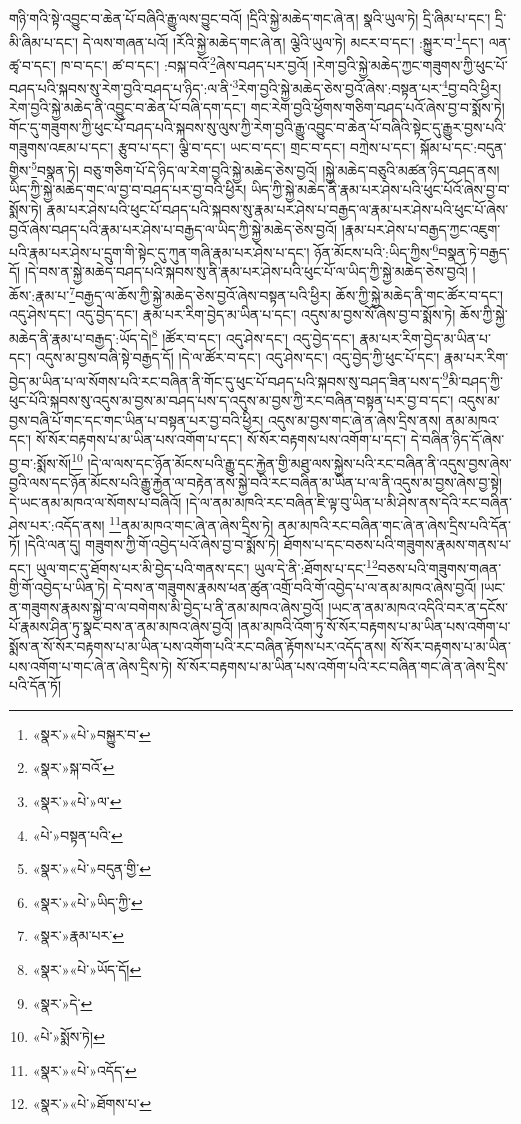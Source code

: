 གཉི་གའི་སྟེ་འབྱུང་བ་ཆེན་པོ་བཞིའི་རྒྱུ་ལས་བྱུང་བའོ། །དྲིའི་སྐྱེ་མཆེད་གང་ཞེ་ན། སྣའི་ཡུལ་ཏེ། དྲི་ཞིམ་པ་དང་། དྲི་མི་ཞིམ་པ་དང་། དེ་ལས་གཞན་པའོ། །རོའི་སྐྱེ་མཆེད་གང་ཞེ་ན། ལྕེའི་ཡུལ་ཏེ། མངར་བ་དང་། :སྐྱུར་བ་\footnote{«སྣར་»«པེ་»བསྐྱུར་བ་}དང་། ལན་ཚྭ་བ་དང་། ཁ་བ་དང་། ཚ་བ་དང་། :བསྐ་བའོ་\footnote{«སྣར་»སྐ་བའོ་}ཞེས་བཤད་པར་བྱའོ། །རེག་བྱའི་སྐྱེ་མཆེད་ཀྱང་གཟུགས་ཀྱི་ཕུང་པོ་བཤད་པའི་སྐབས་སུ་རེག་བྱའི་བཤད་པ་ཉིད་:ལ་ནི་\footnote{«སྣར་»«པེ་»ལ་}རེག་བྱའི་སྐྱེ་མཆེད་ཅེས་བྱའོ་ཞེས་:བསྟན་པར་\footnote{«པེ་»བསྟན་པའི་}བྱ་བའི་ཕྱིར། རེག་བྱའི་སྐྱེ་མཆེད་ནི་འབྱུང་བ་ཆེན་པོ་བཞི་དག་དང་། གང་རེག་བྱའི་ཕྱོགས་གཅིག་བཤད་པའོ་ཞེས་བྱ་བ་སྨོས་ཏེ། གོང་དུ་གཟུགས་ཀྱི་ཕུང་པོ་བཤད་པའི་སྐབས་སུ་ལུས་ཀྱི་རེག་བྱའི་རྒྱུ་འབྱུང་བ་ཆེན་པོ་བཞིའི་སྟེང་དུ་རྒྱུར་བྱས་པའི་གཟུགས་འཇམ་པ་དང་། རྩུབ་པ་དང་། ལྕི་བ་དང་། ཡང་བ་དང་། གྲང་བ་དང་། བཀྲེས་པ་དང་། སྐོམ་པ་དང་:བདུན་གྱིས་\footnote{«སྣར་»«པེ་»བདུན་གྱི་}བསྣན་ཏེ། བཅུ་གཅིག་པོ་དེ་ཉིད་ལ་རེག་བྱའི་སྐྱེ་མཆེད་ཅེས་བྱའོ། །སྐྱེ་མཆེད་བཅུའི་མཚན་ཉིད་བཤད་ནས། ཡིད་ཀྱི་སྐྱེ་མཆེད་གང་ལ་བྱ་བ་བཤད་པར་བྱ་བའི་ཕྱིར། ཡིད་ཀྱི་སྐྱེ་མཆེད་ནི་རྣམ་པར་ཤེས་པའི་ཕུང་པོའོ་ཞེས་བྱ་བ་སྨོས་ཏེ། རྣམ་པར་ཤེས་པའི་ཕུང་པོ་བཤད་པའི་སྐབས་སུ་རྣམ་པར་ཤེས་པ་བརྒྱད་ལ་རྣམ་པར་ཤེས་པའི་ཕུང་པོ་ཞེས་བྱའོ་ཞེས་བཤད་པའི་རྣམ་པར་ཤེས་པ་བརྒྱད་ལ་ཡིད་ཀྱི་སྐྱེ་མཆེད་ཅེས་བྱའོ། །རྣམ་པར་ཤེས་པ་བརྒྱད་ཀྱང་འཇུག་པའི་རྣམ་པར་ཤེས་པ་དྲུག་གི་སྟེང་དུ་ཀུན་གཞི་རྣམ་པར་ཤེས་པ་དང་། ཉོན་མོངས་པའི་:ཡིད་ཀྱིས་\footnote{«སྣར་»«པེ་»ཡིད་ཀྱི་}བསྣན་ཏེ་བརྒྱད་དོ། །དེ་བས་ན་སྐྱེ་མཆེད་བཤད་པའི་སྐབས་སུ་ནི་རྣམ་པར་ཤེས་པའི་ཕུང་པོ་ལ་ཡིད་ཀྱི་སྐྱེ་མཆེད་ཅེས་བྱའོ། །ཆོས་:རྣམ་པ་\footnote{«སྣར་»རྣམ་པར་}བརྒྱད་ལ་ཆོས་ཀྱི་སྐྱེ་མཆེད་ཅེས་བྱའོ་ཞེས་བསྟན་པའི་ཕྱིར། ཆོས་ཀྱི་སྐྱེ་མཆེད་ནི་གང་ཚོར་བ་དང་། འདུ་ཤེས་དང་། འདུ་བྱེད་དང་། རྣམ་པར་རིག་བྱེད་མ་ཡིན་པ་དང་། འདུས་མ་བྱས་སོ་ཞེས་བྱ་བ་སྨོས་ཏེ། ཆོས་ཀྱི་སྐྱེ་མཆེད་ནི་རྣམ་པ་བརྒྱད་:ཡོད་དེ།\footnote{«སྣར་»«པེ་»ཡོད་དོ།} །ཚོར་བ་དང་། འདུ་ཤེས་དང་། འདུ་བྱེད་དང་། རྣམ་པར་རིག་བྱེད་མ་ཡིན་པ་དང་། འདུས་མ་བྱས་བཞི་སྟེ་བརྒྱད་དོ། །དེ་ལ་ཚོར་བ་དང་། འདུ་ཤེས་དང་། འདུ་བྱེད་ཀྱི་ཕུང་པོ་དང་། རྣམ་པར་རིག་བྱེད་མ་ཡིན་པ་ལ་སོགས་པའི་རང་བཞིན་ནི་གོང་དུ་ཕུང་པོ་བཤད་པའི་སྐབས་སུ་བཤད་ཟིན་པས་ད་\footnote{«སྣར་»དེ་}མི་བཤད་ཀྱི་ཕུང་པོའི་སྐབས་སུ་འདུས་མ་བྱས་མ་བཤད་པས་ད་འདུས་མ་བྱས་ཀྱི་རང་བཞིན་བསྟན་པར་བྱ་བ་དང་། འདུས་མ་བྱས་བཞི་པོ་གང་དང་གང་ཡིན་པ་བསྟན་པར་བྱ་བའི་ཕྱིར། འདུས་མ་བྱས་གང་ཞེ་ན་ཞེས་དྲིས་ནས། ནམ་མཁའ་དང་། སོ་སོར་བརྟགས་པ་མ་ཡིན་པས་འགོག་པ་དང་། སོ་སོར་བརྟགས་པས་འགོག་པ་དང་། དེ་བཞིན་ཉིད་དོ་ཞེས་བྱ་བ་:སྨོས་སོ།\footnote{«པེ་»སྨོས་ཏེ།} །དེ་ལ་ལས་དང་ཉོན་མོངས་པའི་རྒྱུ་དང་རྐྱེན་གྱི་མཐུ་ལས་སྐྱེས་པའི་རང་བཞིན་ནི་འདུས་བྱས་ཞེས་བྱའི་ལས་དང་ཉོན་མོངས་པའི་རྒྱུ་རྐྱེན་ལ་བརྟེན་ནས་སྐྱེ་བའི་རང་བཞིན་མ་ཡིན་པ་ལ་ནི་འདུས་མ་བྱས་ཞེས་བྱ་སྟེ། དེ་ཡང་ནམ་མཁའ་ལ་སོགས་པ་བཞིའོ། །དེ་ལ་ནམ་མཁའི་རང་བཞིན་ཇི་ལྟ་བུ་ཡིན་པ་མི་ཤེས་ནས་དེའི་རང་བཞིན་ཤེས་པར་:འདོད་ནས། \footnote{«སྣར་»«པེ་»འདོད་}ནམ་མཁའ་གང་ཞེ་ན་ཞེས་དྲིས་ཏེ། ནམ་མཁའི་རང་བཞིན་གང་ཞེ་ན་ཞེས་དྲིས་པའི་དོན་ཏོ། །དེའི་ལན་དུ། གཟུགས་ཀྱི་གོ་འབྱེད་པའོ་ཞེས་བྱ་བ་སྨོས་ཏེ། ཐོགས་པ་དང་བཅས་པའི་གཟུགས་རྣམས་གནས་པ་དང་། ཡུལ་གང་དུ་ཐོགས་པར་མི་བྱེད་པའི་གནས་དང་། ཡུལ་དེ་ནི་:ཐོགས་པ་དང་\footnote{«སྣར་»«པེ་»ཐོགས་པ་}བཅས་པའི་གཟུགས་གཞན་གྱི་གོ་འབྱེད་པ་ཡིན་ཏེ། དེ་བས་ན་གཟུགས་རྣམས་ཕན་ཚུན་འགྲོ་བའི་གོ་འབྱེད་པ་ལ་ནམ་མཁའ་ཞེས་བྱའོ། །ཡང་ན་གཟུགས་རྣམས་སྐྱེ་བ་ལ་བགེགས་མི་བྱེད་པ་ནི་ནམ་མཁའ་ཞེས་བྱའོ། །ཡང་ན་ནམ་མཁའ་འདིའི་བར་ན་དངོས་པོ་རྣམས་ཤིན་ཏུ་སྣང་བས་ན་ནམ་མཁའ་ཞེས་བྱའོ། །ནམ་མཁའི་འོག་ཏུ་སོ་སོར་བརྟགས་པ་མ་ཡིན་པས་འགོག་པ་སྨོས་ན་སོ་སོར་བརྟགས་པ་མ་ཡིན་པས་འགོག་པའི་རང་བཞིན་རྟོགས་པར་འདོད་ནས། སོ་སོར་བརྟགས་པ་མ་ཡིན་པས་འགོག་པ་གང་ཞེ་ན་ཞེས་དྲིས་ཏེ། སོ་སོར་བརྟགས་པ་མ་ཡིན་པས་འགོག་པའི་རང་བཞིན་གང་ཞེ་ན་ཞེས་དྲིས་པའི་དོན་ཏོ། 